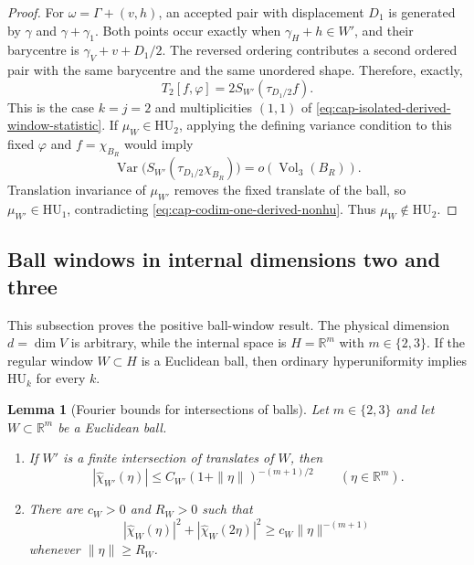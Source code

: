 \documentclass[11pt,reqno,a4paper]{amsart}
\numberwithin{equation}{section}
\theoremstyle{compact}
\newtheorem{lemma}[lemma]{Lemma}
\theoremstyle{definition}
\theoremstyle{definition}
\newcommand{\HU}{\mathrm{HU}}
\newcommand{\Var}{\operatorname{Var}}
\newcommand{\Vol}{\operatorname{Vol}}
\begin{document}
\begin{proof}
For $\omega=\Gamma+(v,h)$, an accepted pair with displacement $D_1$ is
generated by $\gamma$ and $\gamma+\gamma_1$.  Both points occur exactly when
$\gamma_H+h\in W'$, and their barycentre is
$\gamma_V+v+D_1/2$.  The reversed ordering contributes a second ordered pair
with the same barycentre and the same unordered shape.  Therefore, exactly,
\begin{equation}\label{eq:cap-codim-one-pair-reduction}
  T_2[f,\varphi]
  =2S_{W'}(\tau_{D_1/2}f).
\end{equation}
This is the case $k=j=2$ and multiplicities $(1,1)$ of
\eqref{eq:cap-isolated-derived-window-statistic}.
If $\mu_W\in\HU_2$, applying the defining variance condition to this fixed
$\varphi$ and $f=\chi_{B_R}$ would imply
\[
  \Var\bigl(S_{W'}(\tau_{D_1/2}\chi_{B_R})\bigr)
  =o(\Vol_3(B_R)).
\]
Translation invariance of $\mu_{W'}$ removes the fixed translate of the ball,
so $\mu_{W'}\in\HU_1$, contradicting
\eqref{eq:cap-codim-one-derived-nonhu}.  Thus
$\mu_W\notin\HU_2$.
\end{proof}

\subsection{Ball windows in internal dimensions two and three}
\label{subsec:cap-balls-low-dim}

This subsection proves the positive ball-window result.  The physical
dimension $d=\dim V$ is arbitrary, while the internal space is
$H=\mathbb R^m$ with $m\in\{2,3\}$.  If the regular window
$W\subset H$ is a Euclidean ball, then ordinary hyperuniformity implies
$\HU_k$ for every $k$.

\begin{lemma}[Fourier bounds for intersections of balls]
\label{lem:cap-ball-intersections}
Let \(m\in\{2,3\}\) and let \(W\subset\mathbb R^m\) be a Euclidean ball.

\begin{enumerate}
\item If \(W'\) is a finite intersection of translates of \(W\), then
\begin{equation}\label{eq:cap-ball-intersection-decay}
  |\widehat{\chi}_{W'}(\eta)|
  \leq C_{W'}(1+\|\eta\|)^{-(m+1)/2}
  \qquad(\eta\in\mathbb R^m).
\end{equation}

\item There are \(c_W>0\) and \(R_W>0\) such that
\begin{equation}\label{eq:cap-ball-two-harmonic-lower-bound}
  |\widehat{\chi}_W(\eta)|^2
  +|\widehat{\chi}_W(2\eta)|^2
  \geq c_W\|\eta\|^{-(m+1)}
\end{equation}
whenever \(\|\eta\|\geq R_W\).
\end{enumerate}
\end{lemma}
\end{document}
